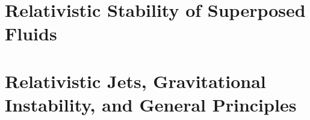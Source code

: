 \documentclass[12pt]{book}
\begin{document}
\part{Relativistic Stability of Superposed Fluids}
\label{part:superposed}













\part{Relativistic Jets, Gravitational Instability, and General Principles}
\label{part:jets-grav}















\backmatter

\listoffigures



\end{document}

